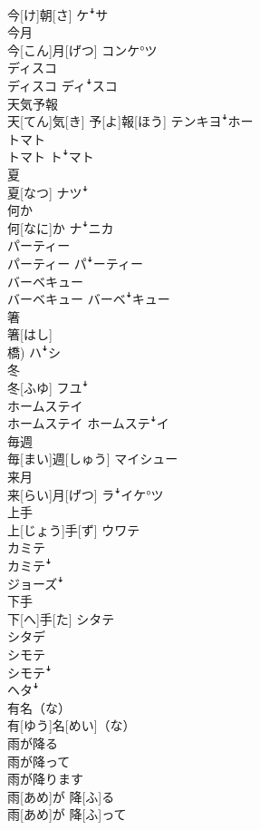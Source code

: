 \documentclass[8pt]{extreport}
\begin{document}
\begin{CJK}{UTF8}{min}
\\	今[け]朝[さ]	ケꜜサ
\\	今月	
\\	今[こん]月[げつ]	コンケ°ツ
\\	ディスコ	
\\	ディスコ	ディꜜスコ
\\	天気予報	
\\	天[てん]気[き] 予[よ]報[ほう]	テンキヨꜜホー
\\	トマト	
\\	トマト	トꜜマト
\\	夏	
\\	夏[なつ]	ナツꜜ
\\	何か	
\\	何[なに]か	ナꜜニカ
\\	パーティー	
\\	パーティー	パꜜーティー
\\	バーベキュー	
\\	バーベキュー	バーベꜜキュー
\\	箸	
\\	箸[はし] 
\\	橋)	ハꜜシ
\\	冬	
\\	冬[ふゆ]	フユꜜ
\\	ホームステイ	
\\	ホームステイ	ホームステꜜイ
\\	毎週	
\\	毎[まい]週[しゅう]	マイシュー
\\	来月	
\\	来[らい]月[げつ]	ラꜜイケ°ツ
\\	上手	
\\	上[じょう]手[ず]	ウワテ 
\\	カミテ 
\\	カミテꜜ 
\\	ジョーズꜜ
\\	下手	
\\	下[へ]手[た]	シタテ 
\\	シタデ 
\\	シモテ 
\\	シモテꜜ 
\\	ヘタꜜ
\\	有名（な）	
\\	有[ゆう]名[めい]（な）	
\\	雨が降る 
\\	雨が降って 
\\	雨が降ります	
\\	雨[あめ]が 降[ふ]る 
\\	雨[あめ]が 降[ふ]って 

\end{CJK}
\end{document}
